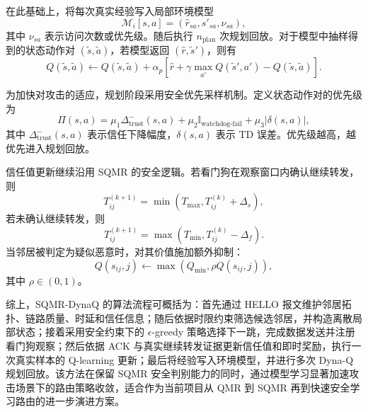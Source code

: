 在此基础上，将每次真实经验写入局部环境模型
\begin{equation}
\mathcal{M}_i[s,a]=(\hat r_{sa}, \hat s'_{sa}, \nu_{sa}),
\end{equation}
其中 $\nu_{sa}$ 表示访问次数或优先级。随后执行 $n_{\mathrm{plan}}$ 次规划回放。对于模型中抽样得到的状态动作对 $(\tilde s,\tilde a)$，若模型返回 $(\hat r,\tilde s')$，则有
\begin{equation}
Q(\tilde s,\tilde a) \leftarrow
Q(\tilde s,\tilde a) +
\alpha_p
\left[
\hat r + \gamma \max_{a'}Q(\tilde s',a') - Q(\tilde s,\tilde a)
\right].
\end{equation}

为加快对攻击的适应，规划阶段采用安全优先采样机制。定义状态动作对的优先级为
\begin{equation}
\Pi(s,a)=
\mu_1 \Delta^{-}_{\mathrm{trust}}(s,a)+
\mu_2 \mathbb{I}_{\mathrm{watchdog\text{-}fail}}+
\mu_3 |\delta(s,a)|,
\end{equation}
其中 $\Delta^{-}_{\mathrm{trust}}(s,a)$ 表示信任下降幅度，$\delta(s,a)$ 表示 TD 误差。优先级越高，越优先进入规划回放。

信任值更新继续沿用 SQMR 的安全逻辑。若看门狗在观察窗口内确认继续转发，则
\begin{equation}
T_{ij}^{(k+1)}=
\min(T_{\max},T_{ij}^{(k)}+\Delta_s),
\end{equation}
若未确认继续转发，则
\begin{equation}
T_{ij}^{(k+1)}=
\max(T_{\min},T_{ij}^{(k)}-\Delta_f).
\end{equation}
当邻居被判定为疑似恶意时，对其价值施加额外抑制：
\begin{equation}
Q(s_{ij},j)\leftarrow \max(Q_{\min}, \rho Q(s_{ij},j)),
\end{equation}
其中 $\rho\in(0,1)$。

综上，SQMR-DynaQ 的算法流程可概括为：首先通过 HELLO 报文维护邻居拓扑、链路质量、时延和信任信息；随后依据时限约束筛选候选邻居，并构造离散局部状态；接着采用安全约束下的 $\epsilon$-greedy 策略选择下一跳，完成数据发送并注册看门狗观察；然后依据 ACK 与真实继续转发证据更新信任值和即时奖励，执行一次真实样本的 Q-learning 更新；最后将经验写入环境模型，并进行多次 Dyna-Q 规划回放。该方法在保留 SQMR 安全判别能力的同时，通过模型学习显著加速攻击场景下的路由策略收敛，适合作为当前项目从 QMR 到 SQMR 再到快速安全学习路由的进一步演进方案。
